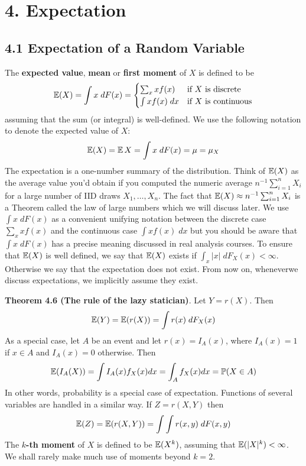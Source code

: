 \section*{4. Expectation}\label{expectation}

\subsection*{4.1 Expectation of a Random
Variable}\label{expectation-of-a-random-variable}
The \textbf{expected value}, \textbf{mean} or \textbf{first moment} of
\(X\) is defined to be
\[
\operatorname{\mathbb{E}}(X) = \int x \; dF(x) = \begin{cases}
\sum_x x f(x) &\text{if } X \text{ is discrete} \\
\int x f(x)\; dx &\text{if } X \text{ is continuous}
\end{cases}
\]
assuming that the sum (or integral) is well-defined. We use the
following notation to denote the expected value of \(X\):
\[
\operatorname{\mathbb{E}}(X) = \operatorname{\mathbb{E}} X = \int x\; dF(x) = \mu = \mu_X
\]
The expectation is a one-number summary of the distribution. Think of
\(\operatorname{\mathbb{E}}(X)\) as the average value you'd obtain if you computed the
numeric average \(n^{-1} \sum_{i=1}^{n} X_{i}\) for a large number of IID
draws \(X_{1}, \dots, X_{n}\). The fact that
\(\operatorname{\mathbb{E}}(X) \approx n^{-1} \sum_{i=1}^{n} X_{i}\) is a Theorem called
the law of large numbers which we will discuss later. We use
\(\int x \; dF(x)\) as a convenient unifying notation between the
discrete case \(\sum_x x f(x)\) and the continuous case
\(\int x f(x) \; dx\) but you should be aware that \(\int x \; dF(x)\)
has a precise meaning discussed in real analysis courses.
To ensure that \(\operatorname{\mathbb{E}}(X)\) is well defined, we say that
\(\operatorname{\mathbb{E}}(X)\) exists if \(\int_x |x| \; dF_X(x) < \infty\).
Otherwise we say that the expectation does not exist. From now on,
wheneverwe discuss expectations, we implicitly assume they exist.

\textbf{Theorem 4.6 (The rule of the lazy statician)}. Let \(Y = r(X)\).
Then
\[
\operatorname{\mathbb{E}}(Y) = \operatorname{\mathbb{E}}(r(X)) = \int r(x) \; dF_X(x)
\]
As a special case, let \(A\) be an event and let \(r(x) = I_A(x)\),
where \(I_A(x) = 1\) if \(x \in A\) and \(I_A(x) = 0\) otherwise. Then
\[
\operatorname{\mathbb{E}}(I_A(X)) = \int I_A(x) f_X(x) dx = \int_A f_X(x) dx = \operatorname{\mathbb{P}}(X \in A)
\]
In other words, probability is a special case of expectation.
Functions of several variables are handled in a similar way. If
\(Z = r(X, Y)\) then
\[
\operatorname{\mathbb{E}}(Z) = \operatorname{\mathbb{E}}(r(X, Y)) = \int \int r(x, y) \; dF(x, y)
\]
The \textbf{\(k\)-th moment} of \(X\) is defined to be
\(\operatorname{\mathbb{E}}(X^{k})\), assuming that \(\operatorname{\mathbb{E}}(|X|^{k}) < \infty\). We
shall rarely make much use of moments beyond \(k = 2\).

